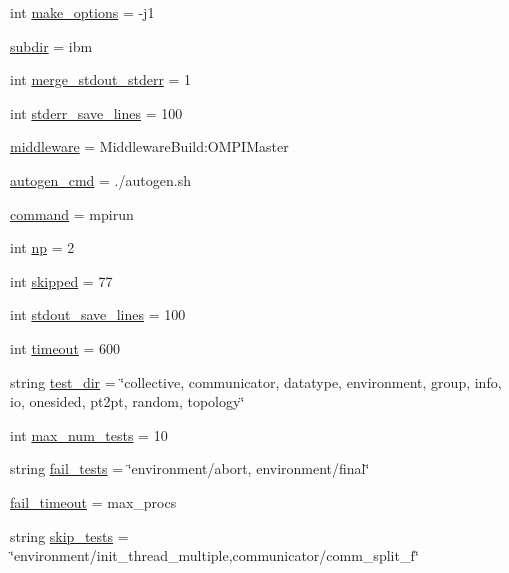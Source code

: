 \begin{DoxyCompactItemize}
int \hyperlink{namespaceompi__snapshot__seq_a42ad6d7d01611e1404c4747596bad26f}{make\-\_\-options} = -\/j1
\item 
\hyperlink{namespaceompi__snapshot__seq_a9d517656629849b65e1dcefbcf9cfd73}{subdir} = ibm
\item 
int \hyperlink{namespaceompi__snapshot__seq_ad98d5c78e44526c2b86baccb081cd46e}{merge\-\_\-stdout\-\_\-stderr} = 1
\item 
int \hyperlink{namespaceompi__snapshot__seq_a4c1170c00e6cc51822262da67c07d721}{stderr\-\_\-save\-\_\-lines} = 100
\item 
\hyperlink{namespaceompi__snapshot__seq_a25acb4b0e7bb13ac146f46ae7f074689}{middleware} = Middleware\-Build\-:\-O\-M\-P\-I\-Master
\item 
\hyperlink{namespaceompi__snapshot__seq_a2e5939b3a3bd4bacecb7b4b33cad0313}{autogen\-\_\-cmd} = ./autogen.\-sh
\item 
\hyperlink{namespaceompi__snapshot__seq_a7ee776e6bd84fc7f42f758751ba25e1e}{command} = mpirun
\item 
int \hyperlink{namespaceompi__snapshot__seq_ac5c6ca602093f9742f1afbfc100f8cfd}{np} = 2
\item 
int \hyperlink{namespaceompi__snapshot__seq_a7261e8a10955a8c08df3d642714fb626}{skipped} = 77
\item 
int \hyperlink{namespaceompi__snapshot__seq_a0521277c015b3e1b74418fc58101d5d6}{stdout\-\_\-save\-\_\-lines} = 100
\item 
int \hyperlink{namespaceompi__snapshot__seq_a4a2554fd9d8c0df86eeaae67f5bc6867}{timeout} = 600
\item 
string \hyperlink{namespaceompi__snapshot__seq_ae15b0abc55bc72ce7a7a4ebe56fc2dfe}{test\-\_\-dir} = \char`\"{}collective, communicator, datatype, environment, group, info, io, onesided, pt2pt, random, topology\char`\"{}
\item 
int \hyperlink{namespaceompi__snapshot__seq_a8c173774cc05394e996dbb13e37d0322}{max\-\_\-num\-\_\-tests} = 10
\item 
string \hyperlink{namespaceompi__snapshot__seq_a1c6caf43d8724d112db736b1cc590bef}{fail\-\_\-tests} = \char`\"{}environment/abort, environment/final\char`\"{}
\item 
\hyperlink{namespaceompi__snapshot__seq_ac68ac424f71d3b098f0e5742e90083c1}{fail\-\_\-timeout} = max\-\_\-procs
\item 
string \hyperlink{namespaceompi__snapshot__seq_a0a1e6182d0b6b408fd0b3642c5b52556}{skip\-\_\-tests} = \char`\"{}environment/init\-\_\-thread\-\_\-multiple,communicator/comm\-\_\-split\-\_\-f\char`\"{}

\end{DoxyCompactItemize}
